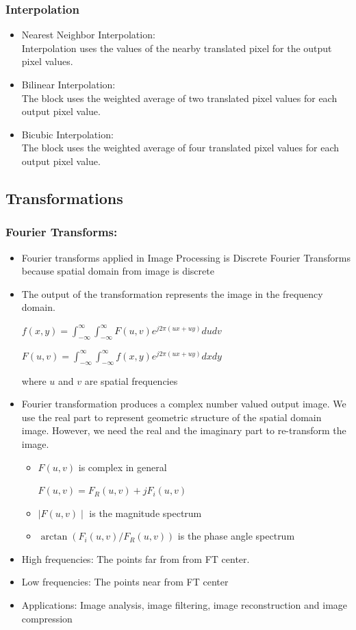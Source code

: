 \subsubsection{Interpolation}
\begin{itemize}
\item Nearest Neighbor Interpolation:\\
Interpolation uses the values of the nearby translated pixel for the output pixel values.
\item Bilinear Interpolation:\\
The block uses the weighted average of two translated pixel values for each output pixel value.
\item Bicubic Interpolation:\\
The block uses the weighted average of four translated pixel values for each output pixel value.
\end{itemize}
\subsection{Transformations}
\subsubsection{Fourier Transforms:}
\begin{itemize}
\item Fourier transforms applied in Image Processing is Discrete Fourier Transforms because spatial domain from image is discrete
\item The output of the transformation represents the image in the frequency domain.
\begin{center}
$
	f(x,y) = \int_{-\infty}^{\infty}\int_{-\infty}^{\infty}F(u,v)e^{j2\pi (ux+uy)}dudv
$
\end{center}
\begin{center}
$
    F(u,v) = \int_{-\infty}^{\infty}\int_{-\infty}^{\infty}f(x,y)e^{j2\pi (ux+uy)}dxdy
$
\end{center}
where $u$ and $v$ are spatial frequencies
\item Fourier transformation produces a complex number valued output image. We use the real part to represent geometric structure of the spatial domain image. However, we need the real and the imaginary part to re-transform the image.
\begin{itemize}
\item $F(u,v)$ is complex in general
\begin{center}
$
	F(u,v) = F_R(u,v) + jF_i(u,v)
$
\end{center}
\item $\mid F(u,v)\mid$ is the magnitude spectrum
\item $\arctan(F_i(u,v)/F_R(u,v))$ is the phase angle spectrum
\end{itemize}
\item High frequencies: The points far from from FT center.
\item Low frequencies: The points near from FT center
\item Applications: Image analysis, image filtering, image reconstruction and image compression
\end{itemize}
